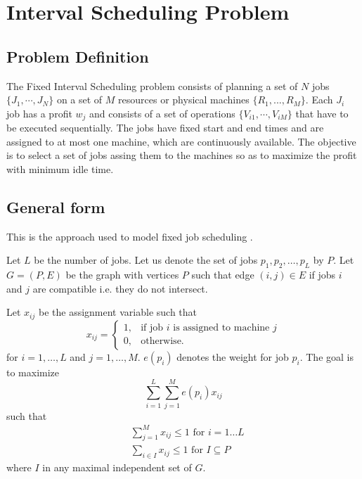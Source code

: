 \documentclass[11pt,a4paper]{article}
\begin{document}
\section{Interval Scheduling Problem}
\subsection{Problem Definition}
The Fixed Interval Scheduling problem consists of planning a set of $N$ jobs $\{J_1, \cdots,J_N \}$ on a set of $M$ resources or physical machines $\{R_1, ...,R_M \}$. Each $J_i$ job has a  profit $w_j$ and consists of a set of operations $\{V_{i1}, \cdots , V_{iM} \}$ that have to be executed sequentially. The jobs have fixed start and end times and are assigned to at most one machine, which are continuously available. The objective is to select a set of jobs assing them to the machines so as to maximize the profit with minimum idle time. 
\subsection{General form}

This is the approach used to model fixed job scheduling \cite{arkin1987scheduling, barcia2005k}. 

Let $L $ be the number of jobs. Let us denote the set of jobs $ p_1,p_2,\dots,p_L $ by $ P $. Let $ G=(P,E) $ be the graph with vertices $ P $ such that edge $(i,j) \in E$ if jobs $ i $ and $ j $ are compatible i.e. they do not intersect.

Let $ x_{ij} $ be the assignment variable such that
\begin{equation}
x_{ij} =   \begin{cases}%
1,      & \text{if job $i$ is assigned to machine $j$}\\
0, & \text{otherwise.}
\end{cases}
\end{equation}
for $ i = 1, \dots ,L $ and $ j=1, \dots ,M  $. $ e(p_i) $ denotes the weight for job $ p_i $. The goal is to maximize 
\begin{equation}
\sum_{i=1}^L \sum_{j=1}^M e(p_{i})x_{ij}	
\end{equation}
such that
\begin{align}
&\sum_{j=1}^M x_{ij} \leq 1 \mbox{ for }i=1\dots L \\
&\sum_{i \in I} x_{ij} \leq 1 \mbox{ for } I \subseteq P
\end{align}
where $ I $ in any maximal independent set of $ G $.
\end{document}
